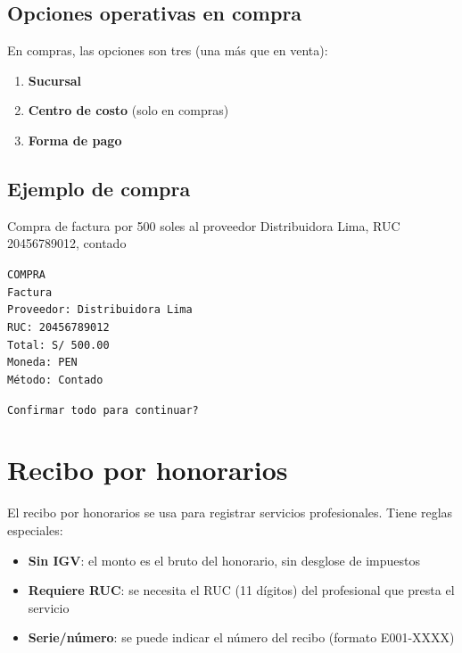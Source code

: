 \documentclass[12pt,a4paper]{article}
\begin{document}
\subsection{Opciones operativas en compra}

En compras, las opciones son tres (una m\'as que en venta):

\begin{enumerate}
    \item \textbf{Sucursal}
    \item \textbf{Centro de costo} (solo en compras)
    \item \textbf{Forma de pago}
\end{enumerate}

\subsection{Ejemplo de compra}

\begin{mensajeusuario}
Compra de factura por 500 soles al proveedor Distribuidora Lima, RUC 20456789012, contado
\end{mensajeusuario}

\begin{mensajebot}
\texttt{COMPRA} \\
\texttt{Factura} \\
\texttt{Proveedor: Distribuidora Lima} \\
\texttt{RUC: 20456789012} \\
\texttt{Total: S/ 500.00} \\
\texttt{Moneda: PEN} \\
\texttt{M\'etodo: Contado}

\medskip
\texttt{Confirmar todo para continuar?}
\end{mensajebot}

\section{Recibo por honorarios}

El recibo por honorarios se usa para registrar servicios profesionales. Tiene reglas especiales:

\begin{itemize}
    \item \textbf{Sin IGV}: el monto es el bruto del honorario, sin desglose de impuestos
    \item \textbf{Requiere RUC}: se necesita el RUC (11 d\'igitos) del profesional que presta el servicio
    \item \textbf{Serie/n\'umero}: se puede indicar el n\'umero del recibo (formato E001-XXXX)
\end{itemize}
\end{document}
